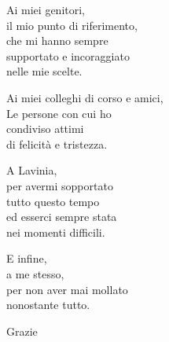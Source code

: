 \begin{flushright}
    \thispagestyle{empty}
    Ai miei genitori,\\
    il mio punto di riferimento,\\
    che mi hanno sempre\\
    supportato e incoraggiato\\
    nelle mie scelte.\\
\end{flushright}

\begin{flushright}
    Ai miei colleghi di corso e amici,\\
    Le persone con cui ho\\
    condiviso attimi\\
    di felicità e tristezza.\\
\end{flushright}

\begin{flushright}
    A Lavinia,\\
    per avermi sopportato\\
    tutto questo tempo\\
    ed esserci sempre stata\\
    nei momenti difficili.\\
\end{flushright}

\begin{flushright}
    E infine,\\ 
    a me stesso,\\
    per non aver mai mollato\\
    nonostante tutto.
\end{flushright}

\begin{flushright}
    Grazie
\end{flushright}